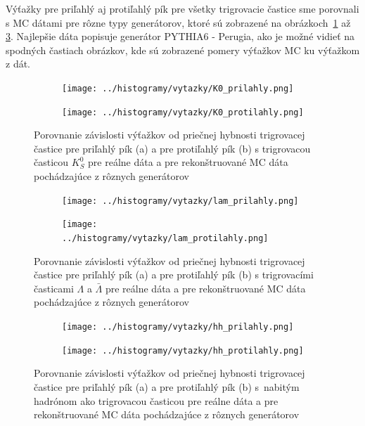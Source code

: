 \documentclass[thesismargins, thesislinespacing]{rnthesis}
\begin{document}
Výťažky pre priľahlý aj protiľahlý pík pre všetky trigrovacie častice sme porovnali s MC dátami pre rôzne typy generátorov, ktoré sú zobrazené na obrázkoch~\ref{porovnanie} až \ref{porovnanieh}. Najlepšie dáta popisuje generátor PYTHIA6 - Perugia, ako je možné vidieť na spodných častiach obrázkov, kde sú zobrazené pomery výťažkov MC ku výťažkom z dát.

\begin{figure}[hbtp!]
	\centering
	\begin{subfigure}{0.5\textwidth}
		\centering
		\texttt{[image: ../histogramy/vytazky/K0\_prilahly.png]}
		\caption{}
	\end{subfigure}%
	\begin{subfigure}{0.5\textwidth}
		\centering
		\texttt{[image: ../histogramy/vytazky/K0\_protilahly.png]}
		\caption{}
	\end{subfigure}
	\caption{Porovnanie závislosti výťažkov od priečnej hybnosti trigrovacej častice pre priľahlý pík (a) a pre protiľahlý pík (b) s trigrovacou časticou $K^0_S$ pre reálne dáta a pre rekonštruované MC dáta pochádzajúce z rôznych generátorov}
	\label{porovnanie}
\end{figure}

\begin{figure}[hbtp!]
	\centering
\begin{subfigure}{0.5\textwidth}
	\centering
	\texttt{[image: ../histogramy/vytazky/lam\_prilahly.png]}
	\caption{}
\end{subfigure}%
\begin{subfigure}{0.5\textwidth}
	\centering
	\texttt{[image: ../histogramy/vytazky/lam\_protilahly.png]}
	\caption{}
\end{subfigure}
	\caption{Porovnanie závislosti výťažkov od priečnej hybnosti trigrovacej častice pre priľahlý pík (a) a pre protiľahlý pík (b) s trigrovacími časticami $\Lambda$ a $\bar{\Lambda}$ pre reálne dáta a pre rekonštruované MC dáta pochádzajúce z rôznych generátorov}
	\label{porovnanieL}
\end{figure}

\begin{figure}[hbtp!]
	\centering
	\begin{subfigure}{0.5\textwidth}
		\centering
		\texttt{[image: ../histogramy/vytazky/hh\_prilahly.png]}
		\caption{}
	\end{subfigure}%
	\begin{subfigure}{0.5\textwidth}
		\centering
		\texttt{[image: ../histogramy/vytazky/hh\_protilahly.png]}
		\caption{}
	\end{subfigure}
	\caption{Porovnanie závislosti výťažkov od priečnej hybnosti trigrovacej častice pre priľahlý pík (a) a pre protiľahlý pík (b) s~nabitým hadrónom ako trigrovacou časticou pre reálne dáta a pre rekonštruované MC dáta pochádzajúce z rôznych generátorov}
	\label{porovnanieh}
\end{figure}
\end{document}
